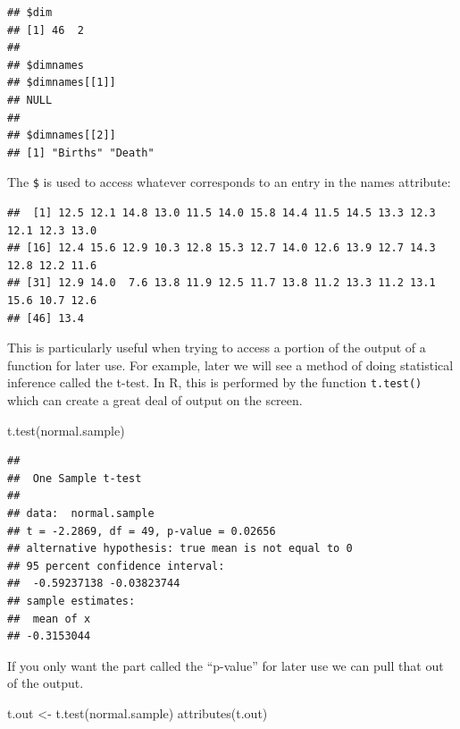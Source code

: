 \documentclass[
]{book}
\newenvironment{Shaded}{\begin{snugshade}}{\end{snugshade}}
\newcommand{\FunctionTok}[1]{\textcolor[rgb]{0.00,0.00,0.00}{#1}}
\newcommand{\NormalTok}[1]{#1}
\newcommand{\OtherTok}[1]{\textcolor[rgb]{0.56,0.35,0.01}{#1}}
\newcommand{\SpecialCharTok}[1]{\textcolor[rgb]{0.00,0.00,0.00}{#1}}
\begin{document}
\begin{verbatim}
## $dim
## [1] 46  2
## 
## $dimnames
## $dimnames[[1]]
## NULL
## 
## $dimnames[[2]]
## [1] "Births" "Death"
\end{verbatim}

The \texttt{\$} is used to access whatever corresponds to an entry in the names attribute:

\begin{Shaded}
\end{Shaded}

\begin{verbatim}
##  [1] 12.5 12.1 14.8 13.0 11.5 14.0 15.8 14.4 11.5 14.5 13.3 12.3 12.1 12.3 13.0
## [16] 12.4 15.6 12.9 10.3 12.8 15.3 12.7 14.0 12.6 13.9 12.7 14.3 12.8 12.2 11.6
## [31] 12.9 14.0  7.6 13.8 11.9 12.5 11.7 13.8 11.2 13.3 11.2 13.1 15.6 10.7 12.6
## [46] 13.4
\end{verbatim}

This is particularly useful when trying to access a portion of the output of a function for later use. For example, later we will see a method of doing statistical inference called the t-test. In R, this is performed by the function \texttt{t.test()} which can create a great deal of output on the screen.

\begin{Shaded}
\begin{Highlighting}[]
\FunctionTok{t.test}\NormalTok{(normal.sample)}
\end{Highlighting}
\end{Shaded}

\begin{verbatim}
## 
##  One Sample t-test
## 
## data:  normal.sample
## t = -2.2869, df = 49, p-value = 0.02656
## alternative hypothesis: true mean is not equal to 0
## 95 percent confidence interval:
##  -0.59237138 -0.03823744
## sample estimates:
##  mean of x 
## -0.3153044
\end{verbatim}

If you only want the part called the ``p-value'' for later use we can pull that out of the output.

\begin{Shaded}
\begin{Highlighting}[]
\NormalTok{t.out }\OtherTok{\textless{}{-}} \FunctionTok{t.test}\NormalTok{(normal.sample)}
\FunctionTok{attributes}\NormalTok{(t.out)}
\end{Highlighting}
\end{Shaded}
\end{document}
